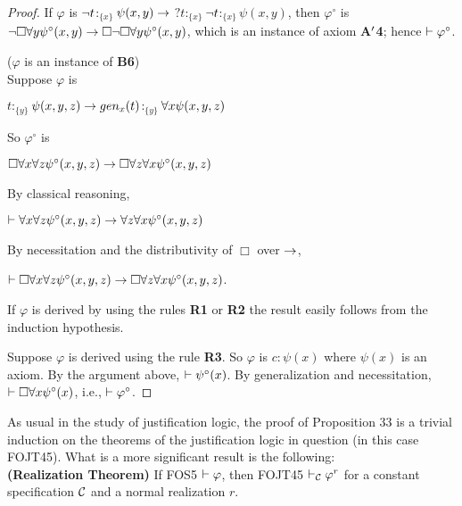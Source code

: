 \begin{proof}
\qquad If $\varphi$ is $\neg t$$:_{\{x\}}$$\psi(x,y) \rightarrow$ $?t$$:_{\{x\}}$$\neg t$$:_{\{x\}}$$\psi(x,y)$, then $\varphi^{\circ}$ is $\neg \Box\forall y \psi^{\circ}(x,y) \rightarrow \Box \neg \Box\forall y \psi^{\circ}(x,y)$, which is an instance of axiom \textbf{A$^{\prime}$4}; hence $\vdash \varphi^{\circ}$.

\pagebreak
($\varphi$ is an instance of \textbf{B6})\\

\qquad Suppose $\varphi$ is

\begin{center}
 $t$$:_{\{y\}}$$\psi(x,y,z) \rightarrow gen_{x}(t)$$:_{\{y\}}$$\forall x\psi(x,y,z)$
\end{center}
So $\varphi^{\circ}$ is
\begin{center}
 $\Box \forall x \forall z\psi^{\circ}(x,y,z) \rightarrow \Box \forall z \forall x\psi^{\circ}(x,y,z)$
\end{center}
By classical reasoning,

\begin{center}
 $\vdash \forall x \forall z\psi^{\circ}(x,y,z) \rightarrow \forall z \forall x\psi^{\circ}(x,y,z)$
\end{center}
By necessitation and the distributivity of $\Box$ over $\rightarrow$,

\begin{center}
 $\vdash \Box \forall x \forall z\psi^{\circ}(x,y,z) \rightarrow \Box \forall z \forall x\psi^{\circ}(x,y,z)$.
\end{center}

\qquad If $\varphi$ is derived by using the rules \textbf{R1} or \textbf{R2} the result easily follows from the induction hypothesis.

\qquad Suppose $\varphi$ is derived using the rule \textbf{R3}. So $\varphi$ is $c$$:$$\psi(x)$ where $\psi(x)$ is an axiom. By the argument above, $\vdash \psi^{\circ}(x)$. By generalization and necessitation, $\vdash \Box \forall x\psi^{\circ}(x)$, i.e., $\vdash \varphi^{\circ}$.
\end{proof}

\qquad As usual in the study of justification logic, the proof of Proposition 33 is a trivial induction on the theorems of the justification logic in question (in this case FOJT45). What is a more significant result is the following:\\


\textbf{(Realization Theorem)} If FOS5 $\vdash \varphi$, then FOJT45 $\vdash_{\mathcal{C}} \varphi^{r}$ for a constant specification $\mathcal{C}$ and a normal realization $r$.\\



